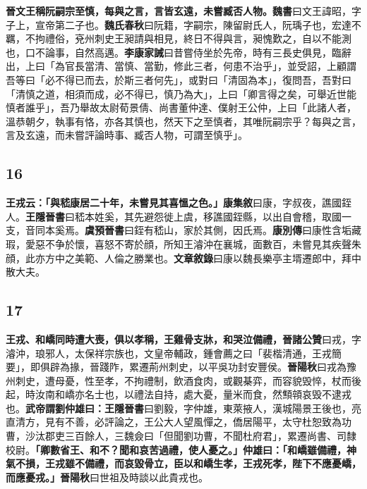 \textbf{晉文王稱阮嗣宗至慎，每與之言，言皆玄遠，未嘗臧否人物。}{\footnotesize \textbf{魏書}曰文王諱昭，字子上，宣帝第二子也。\textbf{魏氏春秋}曰阮籍，字嗣宗，陳留尉氏人，阮瑀子也，宏達不羈，不拘禮俗，兗州刺史王昶請與相見，終日不得與言，昶愧歎之，自以不能測也，口不論事，自然高邁。\textbf{李康家誡}曰昔嘗侍坐於先帝，時有三長史俱見，臨辭出，上曰「為官長當清、當慎、當勤，修此三者，何患不治乎」，並受詔，上顧謂吾等曰「必不得已而去，於斯三者何先」，或對曰「清固為本」，復問吾，吾對曰「清慎之道，相須而成，必不得已，慎乃為大」，上曰「卿言得之矣，可舉近世能慎者誰乎」，吾乃舉故太尉荀景倩、尚書董仲達、僕射王公仲，上曰「此諸人者，溫恭朝夕，執事有恪，亦各其慎也，然天下之至慎者，其唯阮嗣宗乎？每與之言，言及玄遠，而未嘗評論時事、臧否人物，可謂至慎乎」。}

\subsection*{16}

\textbf{王戎云：「與嵇康居二十年，未嘗見其喜慍之色。」}{\footnotesize \textbf{康集敘}曰康，字叔夜，譙國銍人。\textbf{王隱晉書}曰嵇本姓奚，其先避怨徙上虞，移譙國銍縣，以出自會稽，取國一支，音同本奚焉。\textbf{虞預晉書}曰銍有嵇山，家於其側，因氏焉。\textbf{康別傳}曰康性含垢藏瑕，愛惡不争於懷，喜怒不寄於顔，所知王濬沖在襄城，面數百，未嘗見其疾聲朱顔，此亦方中之美範、人倫之勝業也。\textbf{文章敘錄}曰康以魏長樂亭主壻遷郎中，拜中散大夫。}

\subsection*{17}

\textbf{王戎、和嶠同時遭大喪，俱以孝稱，王雞骨支牀，和哭泣備禮，}{\footnotesize \textbf{晉諸公贊}曰戎，字濬沖，琅邪人，太保祥宗族也，文皇帝輔政，鍾會薦之曰「裴楷清通，王戎簡要」，即俱辟為掾，晉踐阼，累遷荊州刺史，以平吳功封安豐侯。\textbf{晉陽秋}曰戎為豫州刺史，遭母憂，性至孝，不拘禮制，飲酒食肉，或觀棊弈，而容貌毁悴，杖而後起，時汝南和嶠亦名士也，以禮法自持，處大憂，量米而食，然顦顇哀毁不逮戎也。}\textbf{武帝謂劉仲雄曰：}{\footnotesize \textbf{王隱晉書}曰劉毅，字仲雄，東萊掖人，漢城陽景王後也，亮直清方，見有不善，必評論之，王公大人望風憚之，僑居陽平，太守杜恕致為功曹，沙汰郡吏三百餘人，三魏僉曰「但聞劉功曹，不聞杜府君」，累遷尚書、司隸校尉。}\textbf{「卿數省王、和不？聞和哀苦過禮，使人憂之。」仲雄曰：「和嶠雖備禮，神氣不損，王戎雖不備禮，而哀毀骨立，臣以和嶠生孝，王戎死孝，陛下不應憂嶠，而應憂戎。」}{\footnotesize \textbf{晉陽秋}曰世祖及時談以此貴戎也。}

